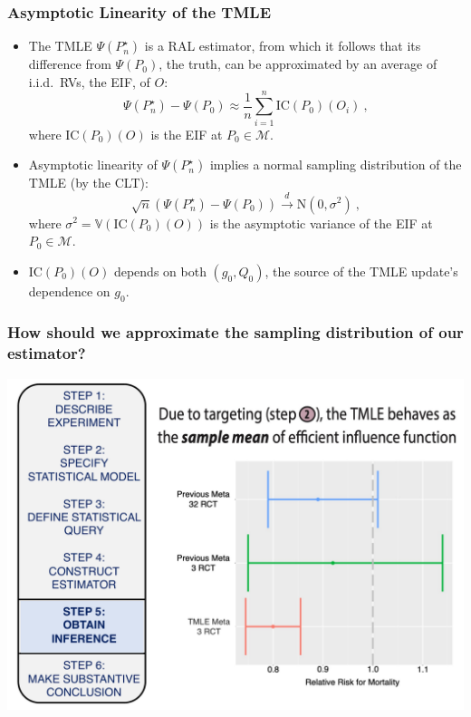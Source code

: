 \documentclass[t]{beamer}
\begin{document}
\begin{frame}
  \frametitle{Asymptotic Linearity of the TMLE}
  \begin{itemize}
    \item The TMLE $\Psi(P_n^{\star})$ is a RAL estimator, from which it follows
      that its difference from $\Psi(P_0)$, the truth, can be approximated by
      an average of i.i.d.~RVs, the EIF, of $O$:
      $$\Psi(P_n^{\star}) - \Psi(P_0) \approx \frac{1}{n}\sum_{i=1}^n
        \text{IC}(P_0)(O_i) \ ,$$ where $\text{IC}(P_0)(O)$ is the EIF at
        $P_0 \in \mathcal{M}$.
    \item Asymptotic linearity of $\Psi(P_n^{\star})$ implies a normal sampling
      distribution of the TMLE (by the CLT):
      $$\sqrt{n}(\Psi(P_n^{\star}) - \Psi(P_0)) \xrightarrow{d} \text{N}(0,
        \sigma^2) \ ,$$ where $\sigma^2 = \mathbb{V}(\text{IC}(P_0)(O))$ is the
        asymptotic variance of the EIF at $P_0 \in \mathcal{M}$.
    \item $\text{IC}(P_0)(O)$ depends on both $(g_0, Q_0)$, the source of the
      TMLE update's dependence on $g_0$.
  \end{itemize}
\end{frame}

\begin{frame}
  \frametitle{How should we approximate the sampling distribution of our estimator?}
  \vspace{-20pt}
  \begin{center}
  \includegraphics[width = 1.05\textwidth]{figures/roadmap5.pdf}
  \end{center}
\end{frame}
\end{document}
